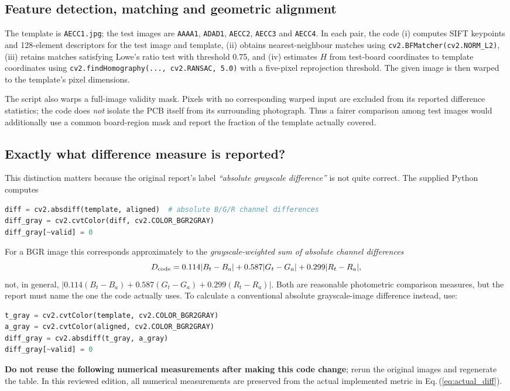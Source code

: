 \documentclass[11pt,a4paper]{article}
\begin{document}
\subsection{Feature detection, matching and geometric alignment}
The template is \texttt{AECC1.jpg}; the test images are \texttt{AAAA1}, \texttt{ADAD1}, \texttt{AECC2}, \texttt{AECC3} and \texttt{AECC4}. In each pair, the code (i) computes SIFT keypoints and 128-element descriptors for the test image and template, (ii) obtains nearest-neighbour matches using \texttt{cv2.BFMatcher(cv2.NORM\_L2)}, (iii) retains matches satisfying Lowe's ratio test with threshold 0.75, and (iv) estimates $H$ from test-board coordinates to template coordinates using \texttt{cv2.findHomography(..., cv2.RANSAC, 5.0)} with a five-pixel reprojection threshold. The given image is then warped to the template's pixel dimensions.

The script also warps a full-image validity mask. Pixels with no corresponding warped input are excluded from its reported difference statistics; the code does \emph{not} isolate the PCB itself from its surrounding photograph. Thus a fairer comparison among test images would additionally use a common board-region mask and report the fraction of the template actually covered.

\subsection{Exactly what difference measure is reported?}
This distinction matters because the original report's label \emph{``absolute grayscale difference''} is not quite correct. The supplied Python computes
\begin{lstlisting}[language=Python]
diff = cv2.absdiff(template, aligned)  # absolute B/G/R channel differences
diff_gray = cv2.cvtColor(diff, cv2.COLOR_BGR2GRAY)
diff_gray[~valid] = 0
\end{lstlisting}
For a BGR image this corresponds approximately to the \emph{grayscale-weighted sum of absolute channel differences}
\begin{equation}
 D_{\rm code}=0.114|B_t-B_a|+0.587|G_t-G_a|+0.299|R_t-R_a|,
\label{eq:actual_diff}
\end{equation}
not, in general, $\left|0.114(B_t-B_a)+0.587(G_t-G_a)+0.299(R_t-R_a)\right|$. Both are reasonable photometric comparison measures, but the report must name the one the code actually uses. To calculate a conventional absolute grayscale-image difference instead, use:
\begin{lstlisting}[language=Python]
t_gray = cv2.cvtColor(template, cv2.COLOR_BGR2GRAY)
a_gray = cv2.cvtColor(aligned, cv2.COLOR_BGR2GRAY)
diff_gray = cv2.absdiff(t_gray, a_gray)
diff_gray[~valid] = 0
\end{lstlisting}
\textbf{Do not reuse the following numerical measurements after making this code change}; rerun the original images and regenerate the table. In this reviewed edition, all numerical measurements are preserved from the actual implemented metric in Eq.\,(\ref{eq:actual_diff}).
\end{document}

